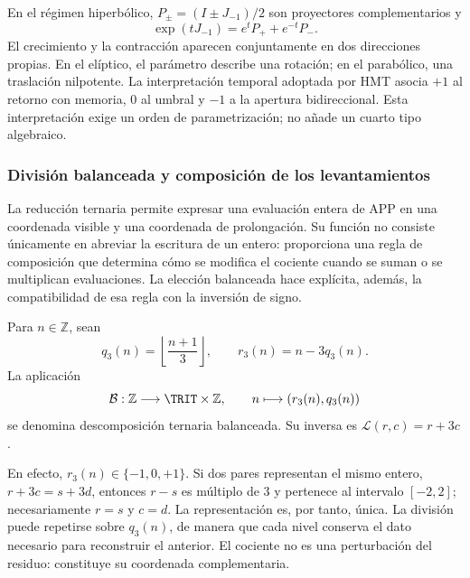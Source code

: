 En el régimen hiperbólico, \(P_\pm=(I\pm J_{-1})/2\) son proyectores complementarios y
\[
 \exp(tJ_{-1})=e^tP_++e^{-t}P_-.
\]
El crecimiento y la contracción aparecen conjuntamente en dos direcciones propias. En el elíptico, el parámetro describe una rotación; en el parabólico, una traslación nilpotente. La interpretación temporal adoptada por HMT asocia \(+1\) al retorno con memoria, \(0\) al umbral y \(-1\) a la apertura bidireccional. Esta interpretación exige un orden de parametrización; no añade un cuarto tipo algebraico.


\subsubsection{División balanceada y composición de los levantamientos}
\label{x_reciprocidad:trit-ampl-div-balanceada}

La reducción ternaria permite expresar una evaluación entera de APP en una
coordenada visible y una coordenada de prolongación. Su función no consiste
únicamente en abreviar la escritura de un entero: proporciona una regla de
composición que determina cómo se modifica el cociente cuando se suman o se
multiplican evaluaciones. La elección balanceada hace explícita, además, la
compatibilidad de esa regla con la inversión de signo.

\begin{definition}
\label{x_reciprocidad:trit-ampl-def-coordenadas}
Para \(n\in\mathbb Z\), sean
\[
 q_3(n)=\left\lfloor\frac{n+1}{3}\right\rfloor,\qquad
 r_3(n)=n-3q_3(n).
\]
La aplicación
\[
 \mathcal B:\mathbb Z\longrightarrow\TRIT\times\mathbb Z,\qquad
 n\longmapsto(r_3(n),q_3(n))
\]
se denomina descomposición ternaria balanceada. Su inversa es
\(\mathcal L(r,c)=r+3c\).
\end{definition}

En efecto, \(r_3(n)\in\{-1,0,+1\}\). Si dos pares representan el mismo entero,
\(r+3c=s+3d\), entonces \(r-s\) es múltiplo de \(3\) y pertenece al intervalo
\([-2,2]\); necesariamente \(r=s\) y \(c=d\). La representación es, por tanto,
única. La división puede repetirse sobre \(q_3(n)\), de manera que cada nivel
conserva el dato necesario para reconstruir el anterior. El cociente no es una
perturbación del residuo: constituye su coordenada complementaria.

